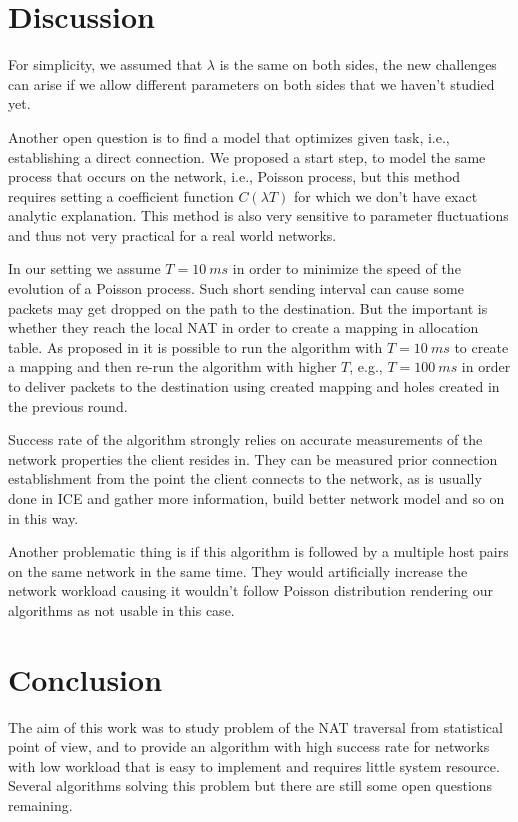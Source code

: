 \documentclass[twoside]{article}
\begin{document}
\begin{multicols}{2}
\section{Discussion}
For simplicity, we assumed that $\lambda$ is the same on both sides, the new challenges 
can arise if we allow different parameters on both sides that we haven't studied yet.

Another open question is to find a model that optimizes given task, i.e., establishing a direct
connection. We proposed a start step, to model the same process that occurs on the network, i.e.,
Poisson process, but this method requires setting a coefficient function $C(\lambda T)$ for which 
we don't have exact analytic explanation. This method is also very sensitive to parameter fluctuations
and thus not very practical for a real world networks. 

In our setting we assume $T=10~ms$ in order to minimize the speed of the evolution of a Poisson process.
Such short sending interval can cause some packets may get dropped on the path to the destination. But the 
important is whether they reach the local NAT in order to create a mapping in allocation table. As proposed 
in \citep{Wang:2006:RSN:1156422.1156550} it is possible to run the algorithm with $T=10~ms$ to create a mapping
and then re-run the algorithm with higher $T$, e.g., $T=100~ms$ in order to deliver packets to the destination
using created mapping and holes created in the previous round.

Success rate of the algorithm strongly relies on accurate measurements of the network 
properties the client resides in. They can be measured prior connection establishment 
from the point the client connects to the network, as is usually done in ICE and gather 
more information, build better network model and so on in this way.


Another problematic thing is if this algorithm is followed by a multiple host pairs on
the same network in the same time. They would artificially increase the network workload
causing it wouldn't follow Poisson distribution rendering our algorithms as not usable in
this case.

\section{Conclusion}
The aim of this work was to study problem of the NAT traversal from statistical point of view,
and to provide an algorithm with high success rate for networks with low workload that is easy to 
implement and requires little system resource. 
Several algorithms solving this problem but there are still some open questions remaining. 


\end{multicols}
\end{document}

